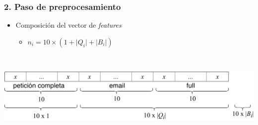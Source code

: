 \begin{frame}[t]
    \frametitle{2. Paso de preprocesamiento}

    \begin{itemize}[<+->]
        \item
        Composición del vector de \textit{features}

        \begin{itemize}[<.->]
            \item
            $ n_{i} = 10 \times \left( 1 + \lvert Q_{i} \rvert + \lvert B_{i} \rvert \right) $
        \end{itemize}
    \end{itemize}

    \\

    \begin{center}
        \includegraphics[width=\textwidth]{images/composition-vector.png}
    \end{center}


\end{frame}

